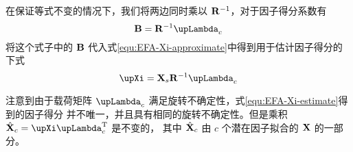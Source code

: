 在保证等式不变的情况下，我们将两边同时乘以 $ \mathbf{R}^{-1} $，对于因子得分系数有
\begin{equation}
    \vB = \vR^{-1}\vLambda_c
\end{equation}
将这个式子中的 $ \mathbf{B} $ 代入式\eqref{equ:EFA-Xi-approximate}中得到用于估计因子得分的下式
\begin{equation}\label{equ:EFA-Xi-estimate}
    \vXi = \vX_s \vR^{-1} \vLambda_c
\end{equation}

注意到由于载荷矩阵 $ \vLambda_c $ 满足旋转不确定性，式\eqref{equ:EFA-Xi-estimate}得到的因子得分
并不唯一，并且具有相同的旋转不确定性。但是乘积 $ \hat{\vX}_c = \vXi\vLambda_c\T $ 是不变的，
其中 $ \hat{\mathbf{X}}_c $ 由 $ c $ 个潜在因子拟合的 $ \mathbf{X} $ 的一部分。